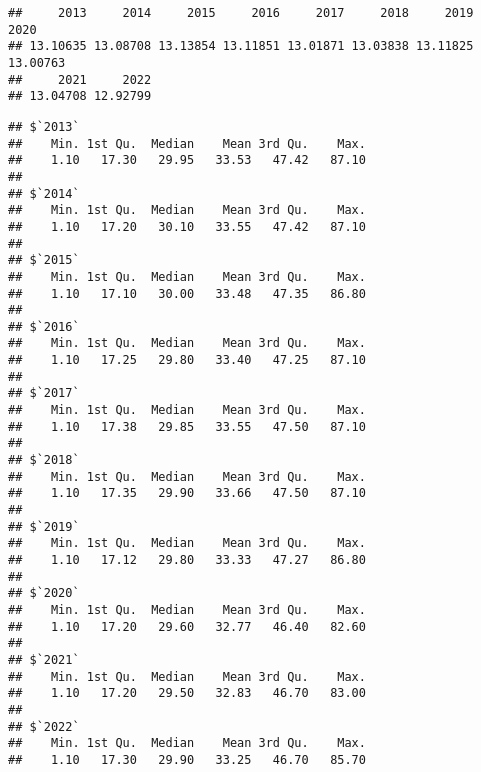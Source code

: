 \documentclass[
]{article}
\newenvironment{Shaded}{\begin{snugshade}}{\end{snugshade}}
\newcommand{\AttributeTok}[1]{\textcolor[rgb]{0.13,0.29,0.53}{#1}}
\newcommand{\ConstantTok}[1]{\textcolor[rgb]{0.56,0.35,0.01}{#1}}
\newcommand{\FunctionTok}[1]{\textcolor[rgb]{0.13,0.29,0.53}{\textbf{#1}}}
\newcommand{\NormalTok}[1]{#1}
\newcommand{\SpecialCharTok}[1]{\textcolor[rgb]{0.81,0.36,0.00}{\textbf{#1}}}
\begin{document}
\begin{Shaded}
\end{Shaded}

\begin{verbatim}
##     2013     2014     2015     2016     2017     2018     2019     2020 
## 13.10635 13.08708 13.13854 13.11851 13.01871 13.03838 13.11825 13.00763 
##     2021     2022 
## 13.04708 12.92799
\end{verbatim}

\begin{Shaded}
\end{Shaded}

\begin{verbatim}
## $`2013`
##    Min. 1st Qu.  Median    Mean 3rd Qu.    Max. 
##    1.10   17.30   29.95   33.53   47.42   87.10 
## 
## $`2014`
##    Min. 1st Qu.  Median    Mean 3rd Qu.    Max. 
##    1.10   17.20   30.10   33.55   47.42   87.10 
## 
## $`2015`
##    Min. 1st Qu.  Median    Mean 3rd Qu.    Max. 
##    1.10   17.10   30.00   33.48   47.35   86.80 
## 
## $`2016`
##    Min. 1st Qu.  Median    Mean 3rd Qu.    Max. 
##    1.10   17.25   29.80   33.40   47.25   87.10 
## 
## $`2017`
##    Min. 1st Qu.  Median    Mean 3rd Qu.    Max. 
##    1.10   17.38   29.85   33.55   47.50   87.10 
## 
## $`2018`
##    Min. 1st Qu.  Median    Mean 3rd Qu.    Max. 
##    1.10   17.35   29.90   33.66   47.50   87.10 
## 
## $`2019`
##    Min. 1st Qu.  Median    Mean 3rd Qu.    Max. 
##    1.10   17.12   29.80   33.33   47.27   86.80 
## 
## $`2020`
##    Min. 1st Qu.  Median    Mean 3rd Qu.    Max. 
##    1.10   17.20   29.60   32.77   46.40   82.60 
## 
## $`2021`
##    Min. 1st Qu.  Median    Mean 3rd Qu.    Max. 
##    1.10   17.20   29.50   32.83   46.70   83.00 
## 
## $`2022`
##    Min. 1st Qu.  Median    Mean 3rd Qu.    Max. 
##    1.10   17.30   29.90   33.25   46.70   85.70
\end{verbatim}
\end{document}
